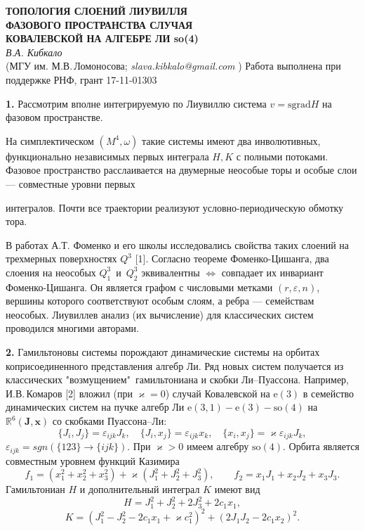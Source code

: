 \begin{center}{ \bf  ТОПОЛОГИЯ СЛОЕНИЙ ЛИУВИЛЛЯ \\
ФАЗОВОГО ПРОСТРАНСТВА СЛУЧАЯ \\
КОВАЛЕВСКОЙ НА АЛГЕБРЕ ЛИ so(4)}\\
{\it В.А. Кибкало } \\
(МГУ им. М.В.\,Ломоносова; {\it slava.kibkalo@gmail.com} )
Работа выполнена при поддержке РНФ, грант  17-11-01303
\end{center}


\textbf{1.} Рассмотрим вполне интегрируемую по Лиувиллю система $v = \textrm{sgrad} H$ на фазовом пространстве.

На симплектическом $(M^4, \omega)$ такие системы имеют два инволютивных, функционально независимых первых интеграла $H, K$ с полными потоками. Фазовое пространство расслаивается на двумерные неособые торы и особые слои --- совместные уровни первых{ интегралов. Почти все траектории реализуют условно-периодическую обмотку тора.

В работах А.Т. Фоменко и его школы исследовались свойства таких слоений на трехмерных поверхностях $Q^3$ [1]. Согласно теореме Фоменко-Цишанга, два слоения на неособых $Q^3_1$~и~$Q^3_2$ эквивалентны $\Leftrightarrow$ совпадает их инвариант Фоменко-Цишанга. Он является графом с числовыми метками $(r, \varepsilon, n)$, вершины которого соответствуют особым слоям, а ребра --- семействам неособых. Лиувиллев анализ (их вычисление) для классических систем проводился многими авторами.

\textbf{2.}  Гамильтоновы системы порождают динамические системы на орбитах коприсоединенного представления алгебр Ли. Ряд новых систем получается из классических "возмущением"\ гамильтониана и скобки Ли--Пуассона. Например, И.В.\,Комаров [2] вложил (при $\varkappa =0$) случай Ковалевской на $\textrm{e}(3)$  в семейство динамических систем на пучке алгебр Ли $\textrm{e}(3,1)-\textrm{e}(3)-\textrm{so}(4)$ на $\mathbb{R}^6(\mathbf{J}, \mathbf{x})$ со скобками Пуассона--Ли: %
\[\{J_i, J_j\} =
\varepsilon_{ijk}J_k, \quad \{J_i, x_j\} = \varepsilon_{ijk}x_k,
\quad \{x_i, x_j\} = \varkappa \varepsilon_{ijk}J_k, \]%
$\varepsilon_{ijk} = sgn(\{123\} \rightarrow \{ijk\})$. При  $\varkappa>0$ имеем алгебру $\textrm{so}(4)$. Орбита является совместным уровнем функций Казимира
%
\[f_1 = (x_1^2 + x_2^2 + x_3^2) + \varkappa (J_1^2 +J_2^2 +J_3^2),
\qquad  f_2 = x_1 J_1 + x_2 J_2 +x_3 J_3.\]
%
Гамильтониан $H$ и дополнительный интеграл $K$ имеют вид
%
\[H = J_1^2 + J_2^2 + 2J_3^2 + 2 c_1 x_1, \]
\[K = (J_1^2 - J_2^2-2c_1 x_1 + \varkappa
c_1^2)^2 + (2J_1 J_2 - 2 c_1 x_2)^2.\]

}
